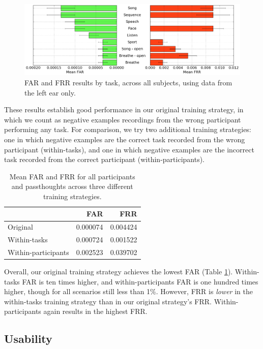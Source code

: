 \documentclass{sigchi}
\begin{document}
\begin{figure}[t]
\centering
\includegraphics[width=.9\linewidth]{./figures/mean-far-and-frr-by-task.png}
\caption{FAR and FRR results by task, across all subjects, using data from the left ear only.}
\label{fig:meanByTask}
\end{figure}

These results establish good performance in our original training strategy, in which we count as negative examples recordings from the wrong participant performing any task. For comparison, we try two additional training strategies: one in which negative examples are the correct task recorded from the wrong participant (within-tasks), and one in which negative examples are the incorrect task recorded from the correct participant (within-participants).

\begin{table}[h]
\begin{center}
\begin{tabular}{lrr}
 & \textbf{FAR} & \textbf{FRR}\\
\hline
Original & 0.000074 & 0.004424\\
Within-tasks & 0.000724 & 0.001522\\
Within-participants & 0.002523 & 0.039702\\
\hline
\end{tabular}
\end{center}
\caption{Mean FAR and FRR for all participants and passthoughts across three different training strategies.}
\label{tab:compare}
\end{table}

Overall, our original training strategy achieves the lowest FAR (Table \ref{tab:compare}). Within-tasks FAR is ten times higher, and within-participants FAR is one hundred times higher, though for all scenarios still less than 1\%.
However, FRR is \textit{lower} in the within-tasks training strategy than in our original strategy's FRR. Within-participants again results in the highest FRR.

\subsection{Usability}
\end{document}
